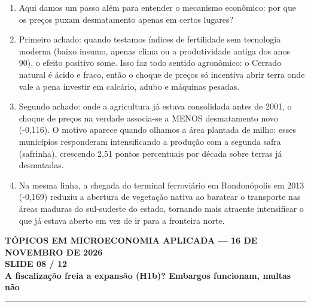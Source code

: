 \documentclass[11pt,a4paper]{article}
\newcommand{\slidenum}{1}
\begin{document}
\vspace{1mm}
\begin{enumerate}[leftmargin=*,label=\textbf{(\arabic*)},itemsep=2.6mm,topsep=1mm]
    \item Aqui damos um passo além para entender o mecanismo econômico: por que os preços puxam desmatamento apenas em certos lugares?
    \item Primeiro achado: quando testamos índices de fertilidade sem tecnologia moderna (baixo insumo, apenas clima ou a produtividade antiga dos anos 90), o efeito positivo some. Isso faz todo sentido agronômico: o Cerrado natural é ácido e fraco, então o choque de preços só incentiva abrir terra onde vale a pena investir em calcário, adubo e máquinas pesadas.
    \item Segundo achado: onde a agricultura já estava consolidada antes de 2001, o choque de preços na verdade associa-se a MENOS desmatamento novo (-0,116). O motivo aparece quando olhamos a área plantada de milho: esses municípios responderam intensificando a produção com a segunda safra (safrinha), crescendo 2,51 pontos percentuais por década sobre terras já desmatadas.
    \item Na mesma linha, a chegada do terminal ferroviário em Rondonópolis em 2013 (-0,169) reduziu a abertura de vegetação nativa ao baratear o transporte nas áreas maduras do sul-sudeste do estado, tornando mais atraente intensificar o que já estava aberto em vez de ir para a fronteira norte.
\end{enumerate}

\newpage

\renewcommand{\slidenum}{8}
\noindent
\begin{minipage}{\textwidth}
\begin{center}
{\color{cinza}\footnotesize\textbf{TÓPICOS EM MICROECONOMIA APLICADA --- 16 DE NOVEMBRO DE 2026}\\[1.2mm]}
{\color{cinza}\bfseries\Large SLIDE 08 / 12\\[1.5mm]}
{\color{verde}\bfseries\LARGE A fiscalização freia a expansão (H1b)? Embargos funcionam, multas não\\[2.5mm]}
\rule{\textwidth}{1pt}
\end{center}
\end{minipage}
\vspace{1.5mm}
\end{document}
